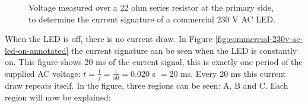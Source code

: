 \begin{figure}[h]
	\centering     %

	\caption{Voltage measured over a 22 ohm series resistor at the primary side, to determine the current signature of a commercial 230 V AC LED.}
\end{figure}



When the LED is off, there is no current draw.
In Figure \ref{fig:commercial-230v-ac-led-on-annotated} the current signature can be seen when the LED is constantly on.
This figure shows 20 ms of the current signal, this is exactly one period of the supplied AC voltage: $t = \frac{1}{f} = \frac{1}{50} = 0.020$ s $= 20$ ms.
Every 20 ms this current draw repeats itself.
In the figure, three regions can be seen: A, B and C.
Each region will now be explained:

